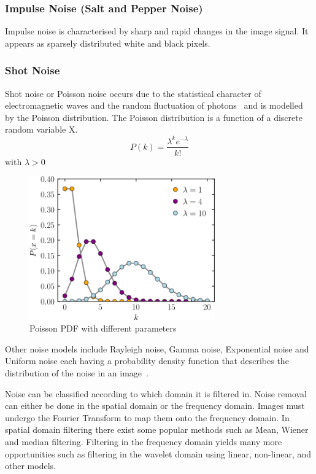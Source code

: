 \documentclass[a4paper, 12pt]{report}
\begin{document}
\subsubsection{Impulse Noise (Salt and Pepper Noise)}
Impulse noise is characterised by sharp and rapid changes in the image signal.
It appears as sparsely distributed white and black pixels.

\subsubsection{Shot Noise}
Shot noise or Poisson noise occurs due to the statistical character of
electromagnetic waves and the random fluctuation of
photons~\cite{boyat2015review} and is modelled by the Poisson distribution. The
Poisson distribution is a function of a discrete random variable X.
\[P(k)=\frac{\lambda^{k}e^{-\lambda}}{k!}\]
with \(\lambda > 0\)
\begin{figure}[ht]
    \centering
    \includegraphics[width=8cm]{poisson distribution.png}
    \caption{Poisson PDF with different parameters~\cite{poisson_image}}
    \label{fig:poisson_image}
\end{figure}

Other noise models include Rayleigh noise, Gamma noise, Exponential noise and
Uniform noise each having a probability density function that describes the
distribution of the noise in an image~\cite{gonzalez_woods_pearson_hall}.\par

Noise can be classified according to which domain it is filtered in. Noise
removal can either be done in the spatial domain or the frequency domain.
Images must undergo the Fourier Transform to map them onto the frequency
domain. In spatial domain filtering there exist some popular methods such as
Mean, Wiener and median filtering. Filtering in the frequency domain yields
many more opportunities such as filtering in the wavelet domain using linear,
non-linear, and other models.
\end{document}
